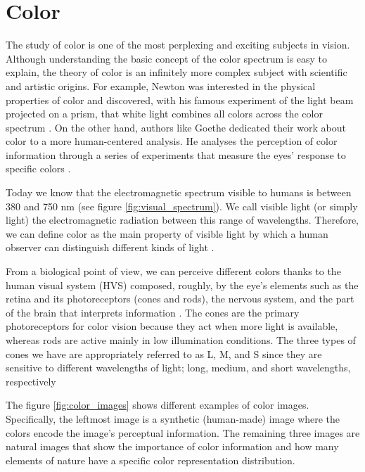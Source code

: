 \section{Color}
The study of color is one of the most perplexing and exciting subjects in vision. Although understanding the basic concept of the color spectrum is easy to explain, the theory of color is an infinitely more complex subject with scientific and artistic origins. For example, Newton was interested in the physical properties of color and discovered, with his famous experiment of the light beam projected on a prism, that white light combines all colors across the color spectrum \citep{Newton:Book:1704}.  On the other hand, authors like Goethe dedicated their work about color to a more human-centered analysis. He analyses the perception of color information through a series of experiments that measure the eyes' response to specific colors \citep{Goethe:Book:2015}.

Today we know that the electromagnetic spectrum visible to humans is between 380 and 750 nm (see figure \ref{fig:visual_spectrum}). We call visible light (or simply light) the electromagnetic radiation between this range of wavelengths. Therefore, we can define color as the main property of visible light by which a human observer can distinguish different kinds of light \citep{Kerr:Online:2003}.

From a biological point of view, we can perceive different colors thanks to the human visual system (HVS) composed, roughly, by the eye's elements such as the retina and its photoreceptors (cones and rods), the nervous system, and the part of the brain that interprets information \citep{Fairchild:Book:2005}. The cones are the primary photoreceptors for color vision because they act when more light is available, whereas rods are active mainly in low illumination conditions. The three types of cones we have are appropriately referred to as L, M, and S since they are sensitive to different wavelengths of light; long, medium, and short wavelengths, respectively

The figure \ref{fig:color_images} shows different examples of color images. Specifically, the leftmost image is a synthetic (human-made) image where the colors encode the image's perceptual information. The remaining three images are natural images that show the importance of color information and how many elements of nature have a specific color representation distribution.

